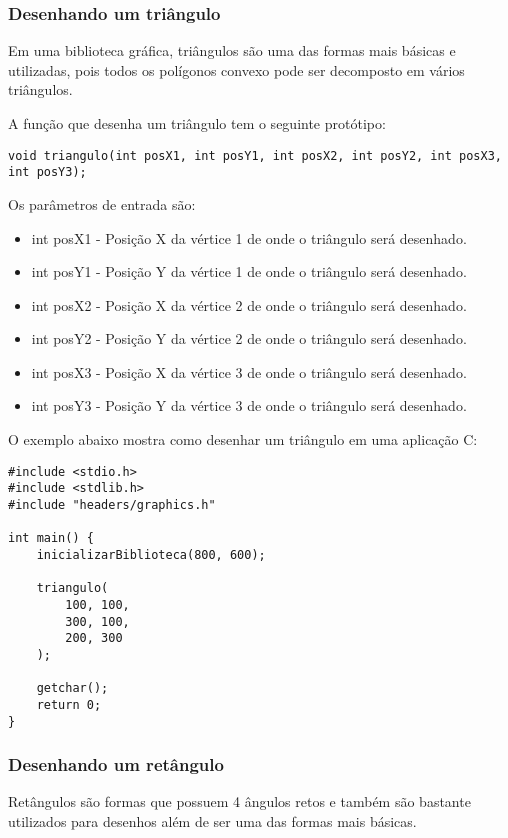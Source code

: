 \documentclass[12pt, %
openright,
oneside, %
a4paper,    %
brazil]{facom-ufu-abntex2}
\begin{document}
\subsubsection{Desenhando um triângulo}
Em uma biblioteca gráfica, triângulos são uma das formas mais básicas e utilizadas, pois todos os polígonos convexo pode ser decomposto em vários triângulos.

A função que desenha um triângulo tem o seguinte protótipo:

\begin{lstlisting}
void triangulo(int posX1, int posY1, int posX2, int posY2, int posX3, int posY3);
\end{lstlisting}

Os parâmetros de entrada são:

\begin{itemize}
    \item int posX1 - Posição X da vértice 1 de onde o triângulo será desenhado.
    \item int posY1 - Posição Y da vértice 1 de onde o triângulo será desenhado.

    \item int posX2 - Posição X da vértice 2 de onde o triângulo será desenhado.
    \item int posY2 - Posição Y da vértice 2 de onde o triângulo será desenhado.

    \item int posX3 - Posição X da vértice 3 de onde o triângulo será desenhado.
    \item int posY3 - Posição Y da vértice 3 de onde o triângulo será desenhado.
\end{itemize}

O exemplo abaixo mostra como desenhar um triângulo em uma aplicação C:

\begin{lstlisting}
#include <stdio.h>
#include <stdlib.h>
#include "headers/graphics.h"

int main() {
    inicializarBiblioteca(800, 600);

    triangulo(
        100, 100,
        300, 100,
        200, 300
    );

    getchar();
    return 0;
}
\end{lstlisting}

\subsubsection{Desenhando um retângulo}
Retângulos são formas que possuem 4 ângulos retos e também são bastante utilizados para desenhos além de ser uma das formas mais básicas.
\end{document}
